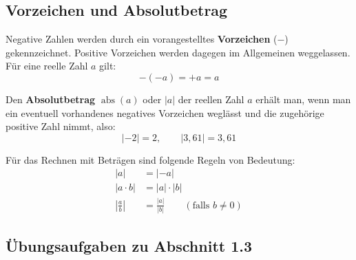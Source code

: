 \subsection{Vorzeichen und Absolutbetrag}

Negative Zahlen werden durch ein vorangestelltes \textbf{Vorzeichen} ($-$) gekennzeichnet. Positive Vorzeichen werden dagegen im Allgemeinen weggelassen. Für eine reelle Zahl $a$ gilt:
\[ -(-a) = +a = a \]

Den \textbf{Absolutbetrag} $\operatorname{abs}(a)$ oder $|a|$ der reellen Zahl $a$ erhält man, wenn man ein eventuell vorhandenes negatives Vorzeichen weglässt und die zugehörige positive Zahl nimmt, also:
\[ |-2| = 2, \qquad |3{,}61| = 3{,}61 \]

Für das Rechnen mit Beträgen sind folgende Regeln von Bedeutung:
\begin{align*}
  |a| &= |-a|\\
  |a \cdot b| &= |a| \cdot |b|\\
  \left|\frac{a}{b}\right| &= \frac{|a|}{|b|} \qquad (\text{falls } b \neq 0)
\end{align*}

\subsection{Übungsaufgaben zu Abschnitt 1.3}

